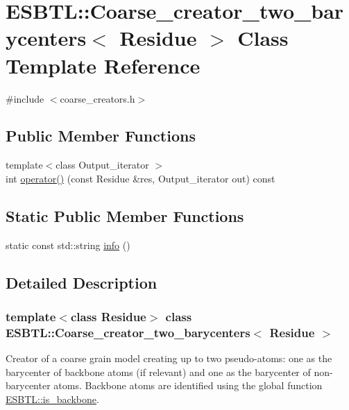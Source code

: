 \hypertarget{classESBTL_1_1Coarse__creator__two__barycenters}{}\section{E\+S\+B\+TL\+:\+:Coarse\+\_\+creator\+\_\+two\+\_\+barycenters$<$ Residue $>$ Class Template Reference}
\label{classESBTL_1_1Coarse__creator__two__barycenters}


{\ttfamily \#include $<$coarse\+\_\+creators.\+h$>$}

\subsection*{Public Member Functions}
\begin{DoxyCompactItemize}
\item 
{\footnotesize template$<$class Output\+\_\+iterator $>$ }\\int \hyperlink{classESBTL_1_1Coarse__creator__two__barycenters_a1de8d90f25b81d0634625a221609a7f7}{operator()} (const Residue \&res, Output\+\_\+iterator out) const
\end{DoxyCompactItemize}
\subsection*{Static Public Member Functions}
\begin{DoxyCompactItemize}
\item 
static const std\+::string \hyperlink{classESBTL_1_1Coarse__creator__two__barycenters_a341b961a5e6a8a14b78c84ea9688a1d5}{info} ()
\end{DoxyCompactItemize}


\subsection{Detailed Description}
\subsubsection*{template$<$class Residue$>$\newline
class E\+S\+B\+T\+L\+::\+Coarse\+\_\+creator\+\_\+two\+\_\+barycenters$<$ Residue $>$}

Creator of a coarse grain model creating up to two pseudo-\/atoms\+: one as the barycenter of backbone atoms (if relevant) and one as the barycenter of non-\/barycenter atoms. Backbone atoms are identified using the global function \hyperlink{namespaceESBTL_a4848989585f87e3953075f09a1089dec}{E\+S\+B\+T\+L\+::is\+\_\+backbone}.


